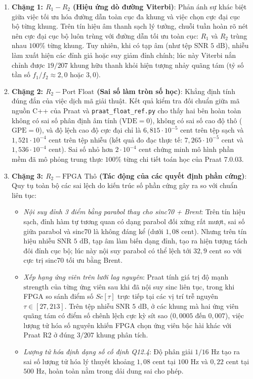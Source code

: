 \begin{enumerate}
    \item \textbf{Chặng 1: $R_1 - R_2$ (Hiệu ứng dò đường Viterbi)}:
    Phản ánh sự khác biệt giữa việc tối ưu hóa đường dẫn toàn cục đa khung và việc chọn cực đại cục bộ từng khung. Trên tín hiệu âm thanh sạch lý tưởng, chuỗi tuần hoàn rõ nét nên cực đại cục bộ luôn trùng với đường dẫn tối ưu toàn cục: $R_1$ và $R_2$ trùng nhau $100\%$ từng khung. Tuy nhiên, khi có tạp âm (như tệp SNR $5\text{ dB}$), nhiễu làm xuất hiện các đỉnh giả hoặc suy giảm đỉnh chính; lúc này Viterbi nắn chỉnh được $19/207\text{ khung}$ hữu thanh khỏi hiện tượng nhảy quãng tám (tỷ số tần số $f_1 / f_2 \approx 2{,}0$ hoặc $3{,}0$).
    
    \item \textbf{Chặng 2: $R_2 - \text{Port Float}$ (Sai số làm tròn số học)}:
    Khẳng định tính đúng đắn của việc dịch mã giải thuật. Kết quả kiểm tra đối chuẩn giữa mã nguồn C++ của Praat và \texttt{praat\_float\_ref.py} cho thấy hai bên hoàn toàn không có sai số phân định âm tính ($\text{VDE} = 0$), không có sai số cao độ thô ($\text{GPE} = 0$), và độ lệch cao độ cực đại chỉ là $6{,}815 \cdot 10^{-5}\text{ cent}$ trên tệp sạch và $1{,}521 \cdot 10^{-4}\text{ cent}$ trên tệp nhiễu (kết quả đo đạc thực tế: $7{,}265 \cdot 10^{-5}\text{ cent}$ và $1{,}536 \cdot 10^{-4}\text{ cent}$). Sai số nhỏ hơn $2 \cdot 10^{-4}\text{ cent}$ chứng minh mô hình phần mềm đã mô phỏng trung thực $100\%$ từng chi tiết toán học của Praat 7.0.03.

    \item \textbf{Chặng 3: $R_2 - \text{FPGA Thô}$ (Tác động của các quyết định phần cứng)}:
    Quy tụ toàn bộ các sai lệch do kiến trúc số phần cứng gây ra so với chuẩn liên tục:
    \begin{itemize}
        \item \emph{Nội suy đỉnh 3 điểm bằng parabol thay cho sinc70 + Brent}: Trên tín hiệu sạch, đỉnh hàm tự tương quan có dạng parabol đối xứng rất mượt, sai số giữa parabol và sinc70 là không đáng kể (dưới $1{,}08\text{ cent}$). Nhưng trên tín hiệu nhiễu SNR $5\text{ dB}$, tạp âm làm biến dạng đỉnh, tạo ra hiện tượng tách đôi đỉnh cục bộ; lúc này nội suy parabol có thể lệch tới $32{,}9\text{ cent}$ so với cực trị sinc70 tối ưu bằng Brent.
        \item \emph{Xếp hạng ứng viên trên lưới lag nguyên}: Praat tính giá trị độ mạnh $\text{strength}$ của từng ứng viên sau khi đã nội suy sinc liên tục, trong khi FPGA so sánh điểm số $Sc[\tau]$ trực tiếp tại các vị trí trễ nguyên $\tau \in [27, 213]$. Trên tệp nhiễu SNR $5\text{ dB}$, ở các khung mà hai ứng viên quãng tám có điểm số chênh lệch cực kỳ sít sao ($0{,}0005$ đến $0{,}007$), việc lượng tử hóa số nguyên khiến FPGA chọn ứng viên bậc hài khác với Praat R2 ở đúng $3/207\text{ khung}$ phân tích.
        \item \emph{Lượng tử hóa định dạng số cố định Q12.4}: Độ phân giải $1/16\text{ Hz}$ tạo ra sai số lượng tử hóa lý thuyết khoảng $1{,}08\text{ cent}$ tại $100\text{ Hz}$ và $0{,}22\text{ cent}$ tại $500\text{ Hz}$, hoàn toàn nằm trong dải dung sai cho phép.
    \end{itemize}


\end{enumerate}
